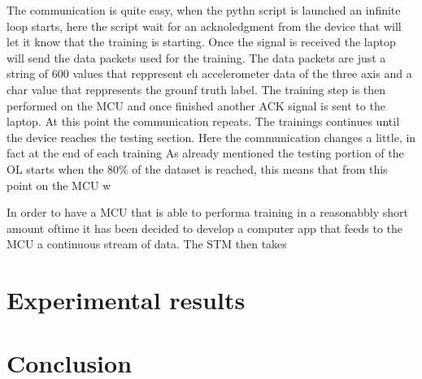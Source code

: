 \documentclass[12pt]{report}
\begin{document}
The communication is quite easy, when the pythn script is launched an infinite loop starts, here the script wait for an acknoledgment from the device that will let it know that the training is starting. Once the signal is received the laptop will send the data packets used for the training. The data packets are just a string of 600 values that reppresent eh accelerometer data of the three axis and a char value that reppresents the grounf truth label. The training step is then performed on the MCU and once finished another ACK signal is sent to the laptop. At this point the communication repeats. 
The trainings continues until the device reaches the testing section. Here the communication changes a little, in fact at the end of each training
As already mentioned the testing portion of the OL starts when the 80\% of the dataset is reached, this means that from this point on the MCU w

In order to have a MCU that is able to performa  training in a reasonabbly short amount oftime it has been decided to develop a computer app that feeds to the MCU a continuous stream of data. The STM then takes










\chapter{Experimental results} 






\chapter{Conclusion}













\end{document}
